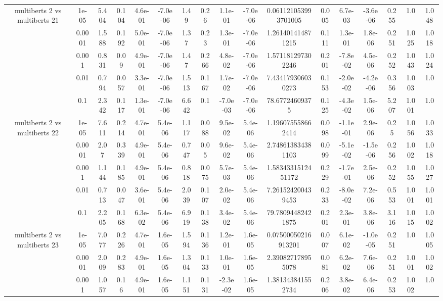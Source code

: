 \begin{tabular}{|c|c|c|c|c|c|c|c|c|c|c|c|c|c|c|c|c|}
\hline
\multirow{5}{*}{multiberts 2 vs multiberts 21} & 1e-05 & 5.404 & 0.104 & 4.6e-01 & -7.0e-06 & 1.49 & 0.26 & 1.1e-01 & -7.0e-06 & 0.061121053993701005 & 0.005 & 6.7e-03 & -3.6e-06 & 0.255 & 1.0 & 1.048 \\
 & 0.0001 & 1.588 & 0.192 & 5.0e-01 & -7.0e-06 & 1.37 & 0.23 & 1.3e-01 & -7.0e-06 & 1.261401414871215 & 0.111 & 1.3e-01 & 1.8e-06 & 0.251 & 1.025 & 1.018 \\
 & 0.001 & 0.831 & 0.09 & 4.9e-01 & -7.0e-06 & 1.47 & 0.266 & 4.8e-02 & -7.0e-06 & 1.571181297302246 & 0.201 & -7.8e-02 & 4.5e-06 & 0.252 & 1.043 & 1.024 \\
 & 0.01 & 0.794 & 0.057 & 3.3e-01 & -7.0e-06 & 1.513 & 0.167 & 1.7e-02 & -7.0e-06 & 7.434179306030273 & 0.153 & -2.0e-02 & -4.2e-06 & 0.356 & 1.003 & 1.0 \\
 & 0.1 & 2.342 & 0.117 & 1.3e-01 & -7.0e-06 & 6.642 & 0.1 & -7.0e-03 & -7.0e-06 & 78.67724609375 & 0.125 & -4.3e-02 & 1.5e-06 & 5.207 & 1.001 & 1.0 \\
\hline
\multirow{5}{*}{multiberts 2 vs multiberts 22} & 1e-05 & 7.611 & 0.214 & 4.7e-01 & 5.4e-06 & 1.117 & 0.088 & 9.5e-02 & 5.4e-06 & 1.196075558662414 & 0.098 & -1.1e-01 & 2.9e-06 & 0.25 & 1.056 & 1.033 \\
 & 0.0001 & 2.07 & 0.339 & 4.9e-01 & 5.4e-06 & 0.747 & 0.05 & 9.6e-02 & 5.4e-06 & 2.748613834381103 & 0.099 & -5.1e-02 & -1.5e-06 & 0.256 & 1.002 & 1.018 \\
 & 0.001 & 1.144 & 0.185 & 4.9e-01 & 5.4e-06 & 0.818 & 0.075 & 5.7e-03 & 5.4e-06 & 1.5834331512451172 & 0.229 & -1.7e-01 & 2.5e-06 & 0.252 & 1.055 & 1.027 \\
 & 0.01 & 0.713 & 0.047 & 3.6e-01 & 5.4e-06 & 2.039 & 0.107 & 2.0e-02 & 5.4e-06 & 7.261524200439453 & 0.233 & -8.0e-02 & 7.2e-06 & 0.553 & 1.001 & 1.001 \\
 & 0.1 & 2.205 & 0.168 & 6.3e-02 & 5.4e-06 & 6.919 & 0.138 & 3.4e-02 & 5.4e-06 & 79.78094482421875 & 0.201 & 2.3e-01 & 3.8e-06 & 3.116 & 1.015 & 1.002 \\
\hline
\multirow{5}{*}{multiberts 2 vs multiberts 23} & 1e-05 & 7.077 & 0.226 & 4.7e-01 & 1.6e-05 & 1.594 & 0.136 & 1.2e-01 & 1.6e-05 & 0.07500050216913201 & 0.007 & 6.1e-02 & -1.0e-05 & 0.251 & 1.0 & 1.005 \\
 & 0.0001 & 2.009 & 0.283 & 4.9e-01 & 1.6e-05 & 1.304 & 0.133 & 1.0e-01 & 1.6e-05 & 2.390827178955078 & 0.081 & 6.2e-02 & 7.6e-06 & 0.251 & 1.001 & 1.002 \\
 & 0.001 & 1.057 & 0.16 & 4.9e-01 & 1.6e-05 & 1.151 & 0.131 & -2.3e-02 & 1.6e-05 & 1.381343841552734 & 0.206 & 3.8e-02 & 6.4e-06 & 0.253 & 1.002 & 1.0 \\

\end{tabular}
